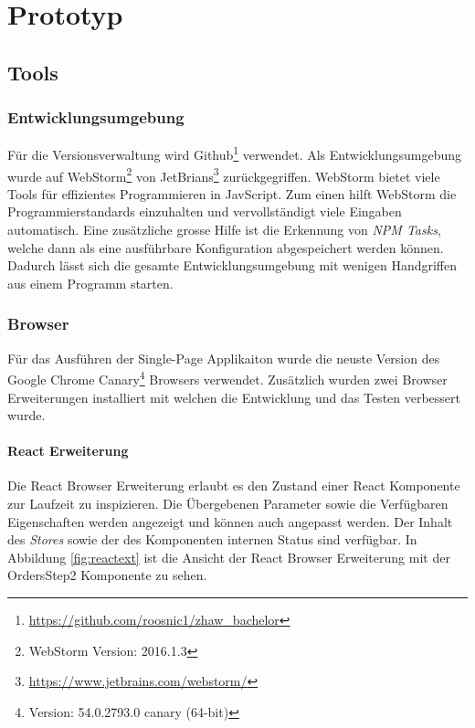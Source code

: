 \chapter{Prototyp}
\label{sec:prototyp}


\section{Tools}
\subsection{Entwicklungsumgebung}
Für die Versionsverwaltung wird Github\footnote{\url{https://github.com/roosnic1/zhaw_bachelor}} verwendet. Als Entwicklungsumgebung wurde auf WebStorm\footnote{WebStorm Version: 2016.1.3} von JetBrians\footnote{\url{https://www.jetbrains.com/webstorm/}} zurückgegriffen. WebStorm bietet viele Tools für effizientes Programmieren in JavScript. Zum einen hilft WebStorm die Programmierstandards einzuhalten und vervollständigt viele Eingaben automatisch. Eine zusätzliche grosse Hilfe ist die Erkennung von \textit{NPM Tasks}, welche dann als eine ausführbare Konfiguration abgespeichert werden können. Dadurch lässt sich die gesamte Entwicklungsumgebung mit wenigen Handgriffen aus einem Programm starten.

\subsection{Browser}
Für das Ausführen der Single-Page Applikaiton wurde die neuste Version des Google Chrome Canary\footnote{Version: 54.0.2793.0 canary (64-bit)} Browsers verwendet. Zusätzlich wurden zwei Browser Erweiterungen installiert mit welchen die Entwicklung und das Testen verbessert wurde.

\subsubsection{React Erweiterung}
Die React Browser Erweiterung erlaubt es den Zustand einer React Komponente zur Laufzeit zu inspizieren. Die Übergebenen Parameter sowie die Verfügbaren Eigenschaften werden angezeigt und können auch angepasst werden. Der Inhalt des \textit{Stores} sowie der des Komponenten internen Status sind verfügbar. In Abbildung \ref{fig:reactext} ist die Ansicht der React Browser Erweiterung mit der OrdersStep2 Komponente zu sehen.

